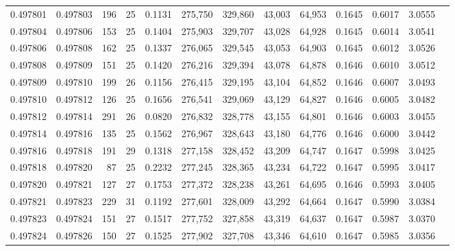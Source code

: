 \begin{tabular}{rrrrrrrrrrrrr}
0.497801 & 0.497803 & 196 &  25 &                                     0.1131 & 275,750 & 329,860 &  43,003 &  64,953 & 0.1645 & 0.6017 & 3.0555 \\
0.497804 & 0.497806 & 153 &  25 &                                     0.1404 & 275,903 & 329,707 &  43,028 &  64,928 & 0.1645 & 0.6014 & 3.0541 \\
0.497806 & 0.497808 & 162 &  25 &                                     0.1337 & 276,065 & 329,545 &  43,053 &  64,903 & 0.1645 & 0.6012 & 3.0526 \\
0.497808 & 0.497809 & 151 &  25 &                                     0.1420 & 276,216 & 329,394 &  43,078 &  64,878 & 0.1646 & 0.6010 & 3.0512 \\
0.497809 & 0.497810 & 199 &  26 &                                     0.1156 & 276,415 & 329,195 &  43,104 &  64,852 & 0.1646 & 0.6007 & 3.0493 \\
0.497810 & 0.497812 & 126 &  25 &                                     0.1656 & 276,541 & 329,069 &  43,129 &  64,827 & 0.1646 & 0.6005 & 3.0482 \\
0.497812 & 0.497814 & 291 &  26 &                                     0.0820 & 276,832 & 328,778 &  43,155 &  64,801 & 0.1646 & 0.6003 & 3.0455 \\
0.497814 & 0.497816 & 135 &  25 &                                     0.1562 & 276,967 & 328,643 &  43,180 &  64,776 & 0.1646 & 0.6000 & 3.0442 \\
0.497816 & 0.497818 & 191 &  29 &                                     0.1318 & 277,158 & 328,452 &  43,209 &  64,747 & 0.1647 & 0.5998 & 3.0425 \\
0.497818 & 0.497820 &  87 &  25 &                                     0.2232 & 277,245 & 328,365 &  43,234 &  64,722 & 0.1647 & 0.5995 & 3.0417 \\
0.497820 & 0.497821 & 127 &  27 &                                     0.1753 & 277,372 & 328,238 &  43,261 &  64,695 & 0.1646 & 0.5993 & 3.0405 \\
0.497821 & 0.497823 & 229 &  31 &                                     0.1192 & 277,601 & 328,009 &  43,292 &  64,664 & 0.1647 & 0.5990 & 3.0384 \\
0.497823 & 0.497824 & 151 &  27 &                                     0.1517 & 277,752 & 327,858 &  43,319 &  64,637 & 0.1647 & 0.5987 & 3.0370 \\
0.497824 & 0.497826 & 150 &  27 &                                     0.1525 & 277,902 & 327,708 &  43,346 &  64,610 & 0.1647 & 0.5985 & 3.0356 \\

\end{tabular}
